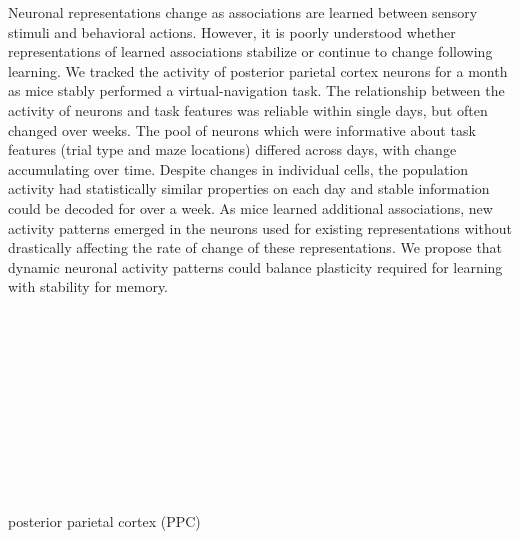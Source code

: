 
\noindent Neuronal representations change as associations are learned between sensory stimuli and behavioral actions. However, it is poorly understood whether representations of learned associations stabilize or continue to change following learning. We tracked the activity of posterior parietal cortex neurons for a month as mice stably performed a virtual-navigation task. The relationship between the activity of neurons and task features was reliable within single days, but often changed over weeks. The pool of neurons which were informative about task features (trial type and maze locations) differed across days, with change accumulating over time. Despite changes in individual cells, the population activity had statistically similar properties on each day and stable information could be decoded for over a week. As mice learned additional associations, new activity patterns emerged in the neurons used for existing representations without drastically affecting the rate of change of these representations. We propose that dynamic neuronal activity patterns could balance plasticity required for learning with stability for memory.
\\
\\
\\
\\
\\
\\
\\
\\
\\
\\
\\
\\
posterior parietal cortex (PPC)



